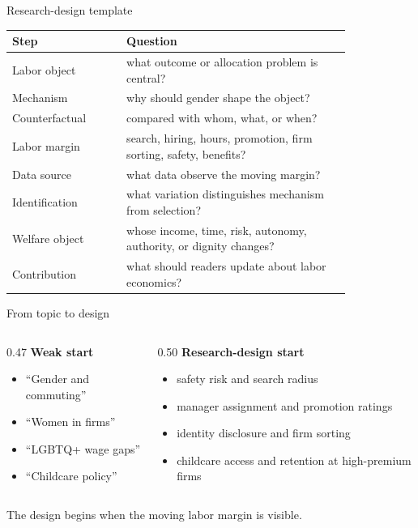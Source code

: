 \documentclass[aspectratio=169,11pt]{beamer}
\begin{document}
\begin{frame}{Research-design template}
\scriptsize
\begin{tabular}{p{0.28\linewidth} p{0.55\linewidth}}
\toprule
Step & Question \\
\midrule
Labor object & what outcome or allocation problem is central? \\
Mechanism & why should gender shape the object? \\
Counterfactual & compared with whom, what, or when? \\
Labor margin & search, hiring, hours, promotion, firm sorting, safety, benefits? \\
Data source & what data observe the moving margin? \\
Identification & what variation distinguishes mechanism from selection? \\
Welfare object & whose income, time, risk, autonomy, authority, or dignity changes? \\
Contribution & what should readers update about labor economics? \\
\bottomrule
\end{tabular}
\end{frame}

\begin{frame}{From topic to design}
\begin{columns}[T,onlytextwidth]
\begin{column}{0.47\linewidth}
\textbf{Weak start}
\begin{itemize}
    \item ``Gender and commuting''
    \item ``Women in firms''
    \item ``LGBTQ+ wage gaps''
    \item ``Childcare policy''
\end{itemize}
\end{column}
\begin{column}{0.50\linewidth}
\textbf{Research-design start}
\begin{itemize}
    \item safety risk and search radius
    \item manager assignment and promotion ratings
    \item identity disclosure and firm sorting
    \item childcare access and retention at high-premium firms
\end{itemize}
\end{column}
\end{columns}
\vspace{0.25cm}
The design begins when the moving labor margin is visible.
\end{frame}
\end{document}
